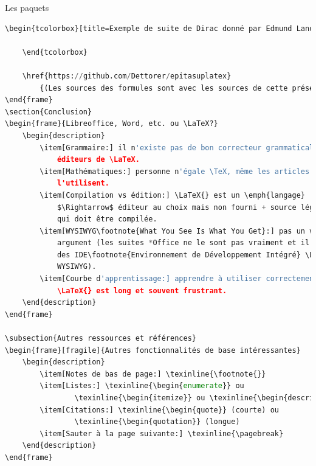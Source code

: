 \documentclass[usenames,dvipsnames,10pt]{beamer} %
\begin{document}
\begin{frame}[fragile]{Les paquets}
\begin{description}
{\begin{lstlisting}[language=Python]
    \begin{tcolorbox}[title=Exemple de suite de Dirac donné par Edmund Landau, overlay=]
        
    \end{tcolorbox}

    \href{https://github.com/Dettorer/epitasuplatex}
        {(Les sources des formules sont avec les sources de cette présentation)}
\end{frame}
\section{Conclusion}
\begin{frame}{Libreoffice, Word, etc. ou \LaTeX?}
    \begin{description}
        \item[Grammaire:] il n'existe pas de bon correcteur grammatical pour les
            éditeurs de \LaTeX.
        \item[Mathématiques:] personne n'égale \TeX, même les articles wikipedia
            l'utilisent.
        \item[Compilation vs édition:] \LaTeX{} est un \emph{langage}
            $\Rightarrow$ éditeur au choix mais non fourni + source légère mais
            qui doit être compilée.
        \item[WYSIWYG\footnote{What You See Is What You Get}:] pas un vrai
            argument (les suites *Office ne le sont pas vraiment et il existe
            des IDE\footnote{Environnement de Développement Intégré} \LaTeX{}
            WYSIWYG).
        \item[Courbe d'apprentissage:] apprendre à utiliser correctement
            \LaTeX{} est long et souvent frustrant.
    \end{description}
\end{frame}

\subsection{Autres ressources et références}
\begin{frame}[fragile]{Autres fonctionnalités de base intéressantes}
    \begin{description}
        \item[Notes de bas de page:] \texinline{\footnote{}}
        \item[Listes:] \texinline{\begin{enumerate}} ou
                \texinline{\begin{itemize}} ou \texinline{\begin{description}}
        \item[Citations:] \texinline{\begin{quote}} (courte) ou
                \texinline{\begin{quotation}} (longue)
        \item[Sauter à la page suivante:] \texinline{\pagebreak}
    \end{description}
\end{frame}


\end{lstlisting}}
\end{description}
\end{frame}
\end{document}
